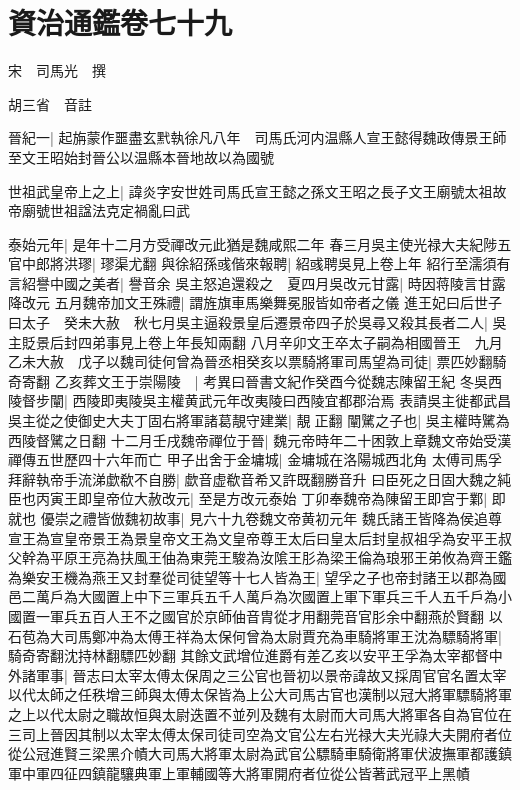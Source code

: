 \chapter{資治通鑑卷七十九}
宋　司馬光　撰

胡三省　音註

晉紀一|{
	起旃蒙作噩盡玄黓執徐凡八年　司馬氏河内温縣人宣王懿得魏政傳景王師至文王昭始封晉公以温縣本晉地故以為國號}


世祖武皇帝上之上|{
	諱炎字安世姓司馬氏宣王懿之孫文王昭之長子文王廟號太祖故帝廟號世祖諡法克定禍亂曰武}


泰始元年|{
	是年十二月方受禪改元此猶是魏咸熙二年}
春三月吳主使光禄大夫紀陟五官中郎將洪璆|{
	璆渠尤翻}
與徐紹孫彧偕來報聘|{
	紹彧聘吳見上卷上年}
紹行至濡須有言紹譽中國之美者|{
	譽音余}
吳主怒追還殺之　夏四月吳改元甘露|{
	時因蒋陵言甘露降改元}
五月魏帝加文王殊禮|{
	謂旌旗車馬樂舞冕服皆如帝者之儀}
進王妃曰后世子曰太子　癸未大赦　秋七月吳主逼殺景皇后遷景帝四子於吳尋又殺其長者二人|{
	吳主貶景后封四弟事見上卷上年長知兩翻}
八月辛卯文王卒太子嗣為相國晉王　九月乙未大赦　戊子以魏司徒何曾為晉丞相癸亥以票騎將軍司馬望為司徒|{
	票匹妙翻騎奇寄翻}
乙亥葬文王于崇陽陵　|{
	考異曰晉書文紀作癸酉今從魏志陳留王紀}
冬吳西陵督步闡|{
	西陵即夷陵吳主權黄武元年改夷陵曰西陵宜都郡治焉}
表請吳主徙都武昌吳主從之使御史大夫丁固右將軍諸葛靚守建業|{
	靚正翻}
闡騭之子也|{
	吳主權時騭為西陵督騭之日翻}
十二月壬戌魏帝禪位于晉|{
	魏元帝時年二十困敦上章魏文帝始受漢禪傳五世歷四十六年而亡}
甲子出舍于金墉城|{
	金墉城在洛陽城西北角}
太傅司馬孚拜辭執帝手流涕歔欷不自勝|{
	歔音虚欷音希又許既翻勝音升}
曰臣死之日固大魏之純臣也丙寅王即皇帝位大赦改元|{
	至是方改元泰始}
丁卯奉魏帝為陳留王即宫于鄴|{
	即就也}
優崇之禮皆倣魏初故事|{
	見六十九卷魏文帝黄初元年}
魏氏諸王皆降為侯追尊宣王為宣皇帝景王為景皇帝文王為文皇帝尊王太后曰皇太后封皇叔祖孚為安平王叔父幹為平原王亮為扶風王伷為東莞王駿為汝隂王肜為梁王倫為琅邪王弟攸為齊王鑑為樂安王機為燕王又封羣從司徒望等十七人皆為王|{
	望孚之子也帝封諸王以郡為國邑二萬戶為大國置上中下三軍兵五千人萬戶為次國置上軍下軍兵三千人五千戶為小國置一軍兵五百人王不之國官於京師伷音胄從才用翻莞音官肜余中翻燕於賢翻}
以石苞為大司馬鄭冲為太傅王祥為太保何曾為太尉賈充為車騎將軍王沈為驃騎將軍|{
	騎奇寄翻沈持林翻驃匹妙翻}
其餘文武增位進爵有差乙亥以安平王孚為太宰都督中外諸軍事|{
	晉志曰太宰太傅太保周之三公官也晉初以景帝諱故又採周官官名置太宰以代太師之任秩增三師與太傅太保皆為上公大司馬古官也漢制以冠大將軍驃騎將軍之上以代太尉之職故恒與太尉迭置不並列及魏有太尉而大司馬大將軍各自為官位在三司上晉因其制以太宰太傅太保司徒司空為文官公左右光禄大夫光祿大夫開府者位從公冠進賢三梁黑介幘大司馬大將軍太尉為武官公驃騎車騎衛將軍伏波撫軍都護鎮軍中軍四征四鎮龍驤典軍上軍輔國等大將軍開府者位從公皆著武冠平上黑幘}
